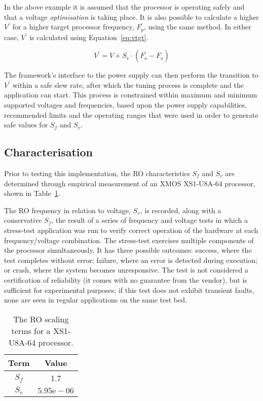 \documentclass[a4paper,twocolumn,DIV=16]{scrartcl}
\begin{document}
In the above example it is assumed that the processor is operating safely and
that a voltage \emph{optimisation} is taking place. It is also possible to
calculate a higher $V^\prime$ for a higher target processor frequency,
$F_p^\prime$, using the same method. In either case, $V^\prime$ is calculated
using Equation~\ref{eq:vtgt}.

\begin{equation}
V^\prime = V + S_v \cdot \left(F_o^\prime - F_o\right)
\label{eq:vtgt}
\end{equation}

The framework's interface to the power supply can then perform the transition to
$V^\prime$ within a safe slew rate, after which the tuning process is complete
and the application can start. This process is constrained within maximum and
minimum supported voltages and frequencies, based upon the power supply
capabilities, recommended limits and the operating ranges that were used in
order to generate safe values for $S_f$ and $S_v$.

\subsection{Characterisation}
\label{sec:characterisation}

Prior to testing this implementation, the RO characteristics $S_f$ and $S_v$ are
determined through empirical measurement of an XMOS XS1-U8A-64 processor, shown
in Table~\ref{tab:characterisation}.

The RO frequency in relation to voltage, $S_v$, is recorded, along with a
conservative $S_f$, the result of a series of frequency and voltage tests in
which a stress-test application was run to verify correct operation of the
hardware at each frequency/voltage combination. The stress-test exercises
multiple components of the processor simultaneously. It has three possible
outcomes: success, where the test completes without error; failure, where an
error is detected during execution; or crash, where the system becomes
unresponsive. The test is not considered a certification of reliability (it
comes with no guarantee from the vendor), but is sufficient for experimental
purposes; if this test does not exhibit transient faults, none are seen in
regular applications on the same test bed.

\begin{table}[h!]
\centering
\begin{tabular}{|c|c|}
\hline 
\textbf{Term} & \textbf{Value}
\\ \hline
$S_f$ & 1.7
\\ \hline
$S_v$ & $5.95\text{e}-06$
\\ \hline
\end{tabular}
\caption{The RO scaling terms for a XS1-U8A-64 processor.}
\label{tab:characterisation}
\end{table}
\end{document}
